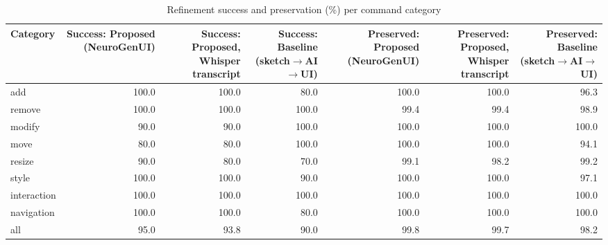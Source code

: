 \begin{table}[t]
\centering
\scriptsize
\caption{Refinement success and preservation (\%) per command category}
\label{tab:refine}
\setlength{\tabcolsep}{3.5pt}
\begin{adjustbox}{max width=\textwidth}
\begin{tabular}{lrrrrrr}
\toprule
\textbf{Category} & \textbf{Success: Proposed (NeuroGenUI)} & \textbf{Success: Proposed, Whisper transcript} & \textbf{Success: Baseline (sketch$\rightarrow$AI$\rightarrow$UI)} & \textbf{Preserved: Proposed (NeuroGenUI)} & \textbf{Preserved: Proposed, Whisper transcript} & \textbf{Preserved: Baseline (sketch$\rightarrow$AI$\rightarrow$UI)} \\
\midrule
add & 100.0 & 100.0 & 80.0 & 100.0 & 100.0 & 96.3 \\
remove & 100.0 & 100.0 & 100.0 & 99.4 & 99.4 & 98.9 \\
modify & 90.0 & 90.0 & 100.0 & 100.0 & 100.0 & 100.0 \\
move & 80.0 & 80.0 & 100.0 & 100.0 & 100.0 & 94.1 \\
resize & 90.0 & 80.0 & 70.0 & 99.1 & 98.2 & 99.2 \\
style & 100.0 & 100.0 & 90.0 & 100.0 & 100.0 & 97.1 \\
interaction & 100.0 & 100.0 & 100.0 & 100.0 & 100.0 & 100.0 \\
navigation & 100.0 & 100.0 & 80.0 & 100.0 & 100.0 & 100.0 \\
all & 95.0 & 93.8 & 90.0 & 99.8 & 99.7 & 98.2 \\
\bottomrule
\end{tabular}
\end{adjustbox}
\end{table}
